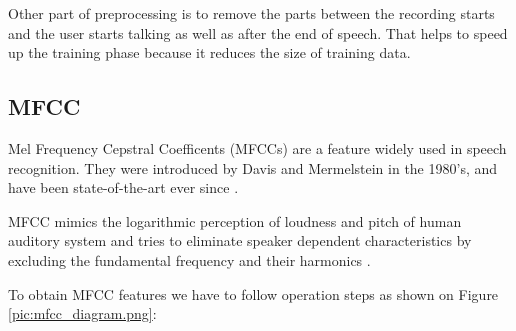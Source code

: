 Other part of preprocessing is to remove the parts between the recording starts and the user starts talking as well as after the end of speech.
That helps to speed up the training phase because it reduces the size of training data.


\subsection{MFCC}

Mel Frequency Cepstral Coefficents (MFCCs) are a feature widely used in speech recognition.
They were introduced by Davis and Mermelstein in the 1980's, and have been state-of-the-art ever since \cite{mfcc_intro}.

MFCC mimics the logarithmic perception of loudness and pitch of human auditory system and tries to eliminate speaker dependent characteristics by excluding the fundamental frequency and their harmonics \cite{mfcc_what}.


To obtain MFCC features we have to follow operation steps as shown on Figure \ref{pic:mfcc_diagram.png}:

